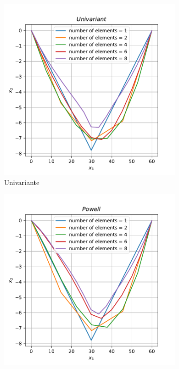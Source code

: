 \documentclass[10pt, a4paper]{article}
\begin{document}
\begin{figure}[htpb]
  \centering
  \begin{subfigure}[b]{0.32\textwidth}
      \centering
      \includegraphics[width=\textwidth]{images/q2b_Univariant.pdf}
      \caption{{\color{red} Univariante}}
      \label{fig:q2b_univariant}
  \end{subfigure}
  \hfill
  \begin{subfigure}[b]{0.32\textwidth}
    \centering
    \includegraphics[width=\textwidth]{images/q2b_Powell.pdf}

\end{subfigure}
\end{figure}
\end{document}

